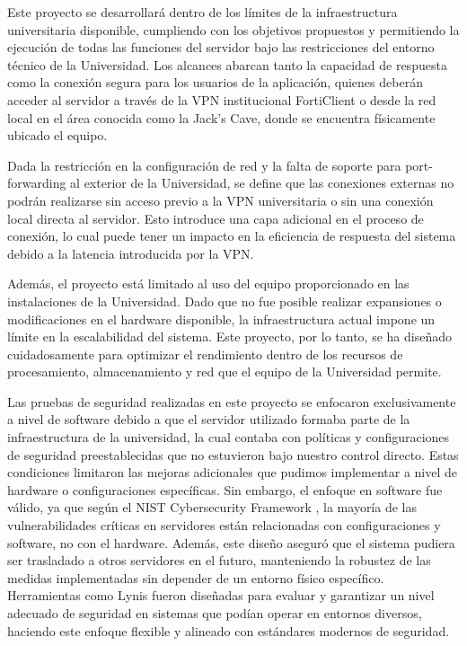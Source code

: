 Este proyecto se desarrollará dentro de los límites de la infraestructura universitaria disponible, cumpliendo con los objetivos propuestos y permitiendo la ejecución de todas las funciones del servidor bajo las restricciones del entorno técnico de la Universidad. Los alcances abarcan tanto la capacidad de respuesta como la conexión segura para los usuarios de la aplicación, quienes deberán acceder al servidor a través de la VPN institucional FortiClient o desde la red local en el área conocida como la Jack's Cave, donde se encuentra físicamente ubicado el equipo.

Dada la restricción en la configuración de red y la falta de soporte para port-forwarding al exterior de la Universidad, se define que las conexiones externas no podrán realizarse sin acceso previo a la VPN universitaria o sin una conexión local directa al servidor. Esto introduce una capa adicional en el proceso de conexión, lo cual puede tener un impacto en la eficiencia de respuesta del sistema debido a la latencia introducida por la VPN.

Además, el proyecto está limitado al uso del equipo proporcionado en las instalaciones de la Universidad. Dado que no fue posible realizar expansiones o modificaciones en el hardware disponible, la infraestructura actual impone un límite en la escalabilidad del sistema. Este proyecto, por lo tanto, se ha diseñado cuidadosamente para optimizar el rendimiento dentro de los recursos de procesamiento, almacenamiento y red que el equipo de la Universidad permite.

Las pruebas de seguridad realizadas en este proyecto se enfocaron exclusivamente a nivel de software debido a que el servidor utilizado formaba parte de la infraestructura de la universidad, la cual contaba con políticas y configuraciones de seguridad preestablecidas que no estuvieron bajo nuestro control directo. Estas condiciones limitaron las mejoras adicionales que pudimos implementar a nivel de hardware o configuraciones específicas. Sin embargo, el enfoque en software fue válido, ya que según el NIST Cybersecurity Framework \cite{NISTCybersecurityFramework}, la mayoría de las vulnerabilidades críticas en servidores están relacionadas con configuraciones y software, no con el hardware. Además, este diseño aseguró que el sistema pudiera ser trasladado a otros servidores en el futuro, manteniendo la robustez de las medidas implementadas sin depender de un entorno físico específico. Herramientas como Lynis fueron diseñadas para evaluar y garantizar un nivel adecuado de seguridad en sistemas que podían operar en entornos diversos, haciendo este enfoque flexible y alineado con estándares modernos de seguridad.

